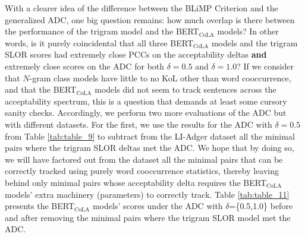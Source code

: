 With a clearer idea of the difference between the BLiMP Criterion and the generalized ADC, one big question remains: how much overlap is there between the performance of the trigram model and the BERT$_\mathrm{CoLA}$ models?  In other words, is it purely coincidental that all three BERT$_\mathrm{CoLA}$ models and the trigram SLOR scores had extremely close PCCs on the acceptability deltas \textbf{and} extremely close scores on the ADC for both $\delta=0.5$ and $\delta=1.0$?  If we consider that $N$-gram class models have little to no KoL other than word cooccurrence, and that the BERT$_\mathrm{CoLA}$ models did not seem to track sentences across the acceptability spectrum, this is a question that demands at least some cursory sanity checks.  Accordingly, we perform two more evaluations of the ADC but with different datasets.  For the first, we use the results for the ADC with $\delta=0.5$ from Table \ref{tab:table_9} to subtract from the LI-Adger dataset all the minimal pairs where the trigram SLOR deltas met the ADC.  We hope that by doing so, we will have factored out from the dataset all the minimal pairs that can be correctly tracked using purely word cooccurrence statistics, thereby leaving behind only minimal pairs whose acceptability delta requires the BERT$_\mathrm{CoLA}$ models' extra machinery (parameters) to correctly track.  Table \ref{tab:table_11} presents the BERT$_\mathrm{CoLA}$ models' scores under the ADC with $\delta$=\{0.5,1.0\} before and after removing the minimal pairs where the trigram SLOR model met the ADC. 



